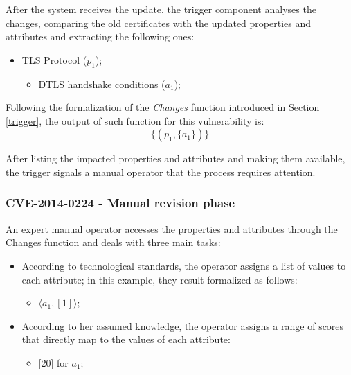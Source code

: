 After the system receives the update, the trigger component analyses the changes, comparing the old certificates with the updated properties and attributes and extracting the following ones:
\begin{itemize}
    \item TLS Protocol (\(p_1\));
    \begin{itemize}
        \item DTLS handshake conditions (\(a_1\));
    \end{itemize}
\end{itemize}

Following the formalization of the \textit{Changes} function introduced in Section \ref{trigger}, the output of such function for this vulnerability is: \[ \{ (p_1, \{a_1\})\}\]

After listing the impacted properties and attributes and making them available, the trigger signals a manual operator that the process requires attention.

\subsubsection{CVE-2014-0224 - Manual revision phase}
An expert manual operator accesses the properties and attributes through the Changes function and deals with three main tasks:
\begin{itemize}
    \item According to technological standards, the operator assigns a list of values to each attribute; in this example, they result formalized as follows:
    \begin{itemize}
        \item \(\langle a_1, [1]\rangle\);
    \end{itemize}
    
    \item According to her assumed knowledge, the operator assigns a range of scores that directly map to the values of each attribute:
    \begin{itemize}
        \item {[20]} for \(a_1\);
    \end{itemize}
\end{itemize}


